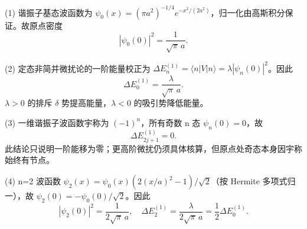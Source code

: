 (1) 谐振子基态波函数为 \(\psi_0(x)=(\pi a^2)^{-1/4}e^{-x^2/(2a^2)}\)，归一化由高斯积分保证。故原点密度
\[
|\psi_0(0)|^2=\frac1{\sqrt\pi\,a}.
\]

(2) 定态非简并微扰论的一阶能量校正为 \(\Delta E_n^{(1)}=\langle n|V|n\rangle=\lambda|\psi_n(0)|^2\)。因此
\[
\Delta E_0^{(1)}=\frac{\lambda}{\sqrt\pi\,a}.
\]
\(\lambda >0\) 的排斥 \(\delta \) 势提高能量，\(\lambda <0\) 的吸引势降低能量。

(3) 一维谐振子波函数宇称为 \((-1)^n\)，所有奇数 n 态 \(\psi_n(0)=0\)，故
\[
\Delta E_{2j+1}^{(1)}=0.
\]
此结论只说明一阶能移为零；更高阶微扰仍须具体核算，但原点处奇态本身因宇称始终有节点。

(4) n=2 波函数 \(\psi_2(x)=\psi_0(x)(2(x/a)^2-1)/\sqrt2\)（按 Hermite 多项式归一），故 \(\psi_2(0)=-\psi_0(0)/\sqrt2\)。因此
\[
|\psi_2(0)|^2=\frac1{2\sqrt\pi\,a},\quad
\Delta E_2^{(1)}=\frac{\lambda}{2\sqrt\pi\,a}
=\frac12\Delta E_0^{(1)}.
\]
